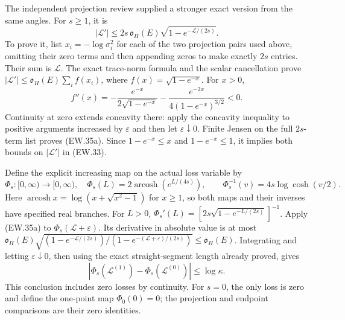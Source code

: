 The independent projection review supplied a stronger exact version
from the same angles. For $s\ge1$, it is
\[
 \boxed{|\mathscr L'|\le
 2s\,\mathfrak o_H(E)\sqrt{1-e^{-\mathscr L/(2s)}}.}         \tag{EW.35a}
\]
To prove it, list $x_i=-\log\sigma_i^2$ for each of the two
projection pairs used above, omitting their zero terms and then
appending zeros to make exactly $2s$ entries. Their sum is
$\mathscr L$. The exact trace-norm formula and the scalar
cancellation prove
$|\mathscr L'|\le\mathfrak o_H(E)\sum_i f(x_i)$, where
$f(x)=\sqrt{1-e^{-x}}$. For $x>0$,
\[
 f''(x)=-\frac{e^{-x}}{2\sqrt{1-e^{-x}}}
        -\frac{e^{-2x}}{4(1-e^{-x})^{3/2}}<0.
\]
Continuity at zero extends concavity there: apply the concavity
inequality to positive arguments increased by $\varepsilon$ and
then let $\varepsilon\downarrow0$. Finite Jensen on the full
$2s$-term list proves (EW.35a). Since $1-e^{-x}\le x$ and
$1-e^{-x}\le1$, it implies both bounds on $|\mathscr L'|$
in (EW.33).

Define the explicit increasing map on the actual loss variable by
\[
 \Phi_s:[0,\infty)\longrightarrow[0,\infty),\quad
 \Phi_s(L)=2\operatorname{arcosh}(e^{L/(4s)}),\qquad
 \Phi_s^{-1}(v)=4s\log\cosh(v/2).
\]
Here $\operatorname{arcosh}x=\log(x+\sqrt{x^2-1})$ for
$x\ge1$, so both maps and their inverses have specified real
branches. For $L>0$,
$\Phi_s'(L)=[2s\sqrt{1-e^{-L/(2s)}}]^{-1}$.
Apply (EW.35a) to $\Phi_s(\mathscr L+\varepsilon)$.
Its derivative in absolute value is at most
$\mathfrak o_H(E)\sqrt{(1-e^{-\mathscr L/(2s)})/
(1-e^{-(\mathscr L+\varepsilon)/(2s)})}\le\mathfrak o_H(E)$.
Integrating and letting $\varepsilon\downarrow0$, then using
the exact straight-segment length already proved, gives
\[
 \boxed{|\Phi_s(\mathscr L^{(1)})-
               \Phi_s(\mathscr L^{(0)})|\le\log\kappa.}      \tag{EW.35b}
\]
This conclusion includes zero losses by continuity. For $s=0$,
the only loss is zero and define the one-point map $\Phi_0(0)=0$;
the projection and endpoint comparisons are their zero identities.

